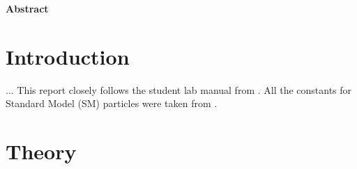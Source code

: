 \documentclass[a4paper]{report}
\numberwithin{equation}{section}
\begin{document}
\begin{titlepage}
	\vspace*{5em}

	\begin{minipage}{0.8\textwidth}
		\begin{centering}
			\textbf{Abstract}\\[0.2cm]
            
		\end{centering}
	\end{minipage}
	
	
	
	
	
	
	 
	
	
\end{titlepage}

\tableofcontents

\chapter{Introduction} \label{chap:intro}

...
This report closely follows the student lab manual from \cite{labman}. All the constants for Standard Model (SM) particles were taken from \cite{ParticleDataGroup:2020ssz}. 

\chapter{Theory} \label{chap:theory}
\end{document}

